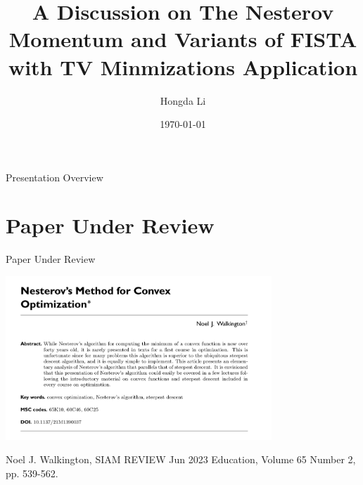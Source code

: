 \documentclass[11pt]{beamer}
\author{Hongda Li}
\title[TV Min and Nesterov Acc]{A Discussion on The Nesterov Momentum and Variants of FISTA with TV Minmizations Application}
\institute[]{UBC Okangan}
\date{\today}
\theoremstyle{definition}
\begin{document}
\begin{frame}
    \titlepage
\end{frame}

\begin{frame}{Presentation Overview}
    \tableofcontents
\end{frame}

\section{Paper Under Review}
    \begin{frame}{Paper Under Review}
        \begin{center}
            \includegraphics[width=10cm]{Assets/paper-titlepage.png}    
        \end{center}
        Noel J. Walkington, SIAM REVIEW Jun 2023 Education, Volume 65 Number 2, pp. 539-562. \cite{noel_nesterovs_nodate}
    \end{frame}
    
\end{document}
